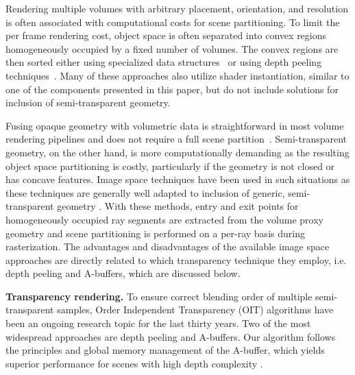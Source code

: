 \documentclass{egpubl}
\newcommand{\ab}{\mbox{A-buffer}}
\begin{document}
Rendering multiple volumes with arbitrary placement, orientation, and resolution is often associated with computational costs for scene partitioning. 
To limit the per frame rendering cost, object space is often separated into convex regions homogeneously occupied by a fixed number of volumes. 
The convex regions are then sorted either using specialized data structures~\cite{grimm04vobjects,lindholm2009fused,Lux2009} or using depth peeling techniques~\cite{Plate2007,rossler08multishader}. 
Many of these approaches also utilize shader instantiation, similar to one of the components presented in this paper, but do not include solutions for inclusion of semi-transparent geometry. 


Fusing opaque geometry with volumetric data is straightforward in most volume rendering pipelines and does not require a full scene partition~\cite{engel2006volume}. 
Semi-transparent geometry, on the other hand, is more computationally demanding as the resulting object space partitioning is costly, particularly if the geometry is not closed or has concave features. 
Image space techniques have been used in such situations as these techniques are generally well adapted to inclusion of generic, semi-transparent geometry \cite{brecheisen08multimodal,kainz2009ray}. 
With these methods, entry and exit points for homogeneously occupied ray segments are extracted from the volume proxy geometry and scene partitioning is performed on a per-ray basis during rasterization.
The advantages and disadvantages of the available image space approaches are directly related to which transparency technique they employ, i.e. depth peeling and \ab{}s, which are discussed below. 


\noindent\textbf{Transparency rendering.}
%
To ensure correct blending order of multiple semi-transparent samples, Order Independent Transparency (OIT) algorithms have been an ongoing research topic for the last thirty years.
Two of the most widespread approaches are depth peeling and \ab{}s. 
Our algorithm follows the principles and global memory management of the \ab{}, which yields superior performance for scenes with high depth complexity \cite{Yang2010,Kauker2013}. 
\end{document}
